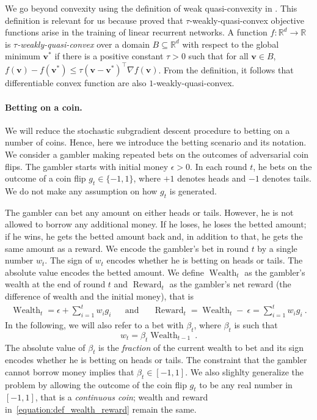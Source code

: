 \documentclass{article}
\newcommand{\bv}{\boldsymbol{v}}
\DeclareMathOperator{\Wealth}{Wealth}
\DeclareMathOperator{\Reward}{Reward}
\newcommand{\field}[1]{\mathbb{#1}}
\newcommand{\R}{\field{R}}
\begin{document}
We go beyond convexity using the definition of weak quasi-convexity in \citet{HardtMR16}. 
This definition is relevant for us because \citet{HardtMR16} proved that $\tau$-weakly-quasi-convex objective functions arise in the training of linear recurrent networks.
A function $f:\R^d\to \R$ is \emph{$\tau$-weakly-quasi-convex} over a domain $B \subseteq \R^d$ with respect to the global minimum $\bv^*$ if there is a positive constant $\tau > 0$
such that for all $\bv \in B$, $f(\bv)-f(\bv^*) \leq \tau (\bv -\bv^*)^\top \nabla f(\bv)$. From the definition, it follows that differentiable convex function are also $1$-weakly-quasi-convex.

\paragraph{Betting on a coin.}
We will reduce the stochastic subgradient descent procedure to betting on a number of coins. Hence, here we introduce the betting scenario and its notation. We consider a gambler making repeated bets on the
outcomes of adversarial coin flips. The gambler starts with initial
money $\epsilon > 0$. In each round $t$, he bets on the outcome of a coin
flip $g_t \in \{-1,1\}$, where $+1$ denotes heads and $-1$ denotes tails.  We
do not make any assumption on how $g_t$ is generated.

The gambler can bet any amount on either heads or tails. However, he is not
allowed to borrow any additional money. If he loses, he loses the betted
amount; if he wins, he gets the betted amount back and, in addition to that, he
gets the same amount as a reward.  We encode the gambler's bet in round $t$ by
a single number $w_t$. The sign of $w_t$ encodes whether he is betting on heads
or tails. The absolute value encodes the betted amount.  We define $\Wealth_t$
as the gambler's wealth at the end of round $t$ and $\Reward_t$ as the
gambler's net reward (the difference of wealth and the initial money), that is
\begin{align}
\label{equation:def_wealth_reward}
\Wealth_t = \epsilon + \sum_{i=1}^t w_i g_i &
& \text{and} &
& \Reward_t = \Wealth_t - \ \epsilon = \sum_{i=1}^t w_i g_i~.
\end{align}
In the following, we will also refer to a bet with $\beta_t$, where $\beta_t$
is such that
\begin{equation}
\label{equation:def_wt}
w_t = \beta_t \Wealth_{t-1}~.
\end{equation}
The absolute value of $\beta_t$ is the \emph{fraction} of the current wealth to
bet and its sign encodes whether he is betting on heads or tails. The
constraint that the gambler cannot borrow money implies that $\beta_t \in
[-1,1]$.
We also slighlty generalize the problem by allowing the outcome of the coin flip
$g_t$ to be any real number in $[-1,1]$, that is a \emph{continuous coin}; wealth and reward in~\eqref{equation:def_wealth_reward} remain the same.
\end{document}

